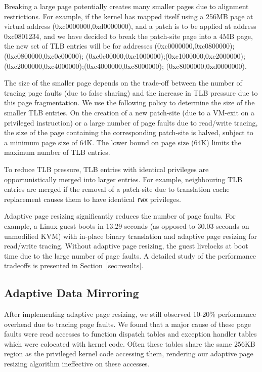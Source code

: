 \documentclass[10pt,twocolumn]{article}
\begin{document}
Breaking a large page potentially creates
many smaller pages due to alignment restrictions.
For example, if the kernel has mapped
itself using a 256MB page at virtual address (0xc0000000,0xd0000000), and a
patch is to be applied at address 0xc0801234, and we have decided to break
the patch-site page into a 4MB page, the new set of TLB entries will be for
addresses
(0xc0000000,0xc0800000);(0xc0800000,0xc0c00000);
(0xc0c00000,0xc1000000);(0xc1000000,0xc2000000);
(0xc2000000,0xc4000000);(0xc4000000,0xc8000000);
(0xc8000000,0xd0000000).

The size of the smaller page depends on the trade-off between the number
of tracing page faults (due to false sharing) and the increase in TLB pressure
due to this page fragmentation.
We use the following policy to determine the size of the smaller TLB entries. On the
creation of a new patch-site (due to a VM-exit on a privileged instruction) or a
large number of page faults due to read/write tracing,
the size of the page
containing the corresponding patch-site is halved, subject to
a minimum page size of 64K.
The lower bound on page size (64K) limits the maximum number of TLB entries.

To reduce TLB pressure, TLB entries with identical privileges are
opportunistically merged into
larger entries. For example, neighbouring TLB entries are merged if the
removal of a patch-site due to translation cache replacement causes
them to have identical {\tt rwx} privileges.

Adaptive page resizing significantly reduces the number of page faults. For
example, a Linux guest boots in 13.29 seconds (as opposed to 30.03 seconds on
unmodified KVM) with in-place binary translation
and adaptive page resizing for read/write tracing. Without adaptive page resizing,
the guest livelocks at boot time due to the large number of
page faults. A detailed study of the performance tradeoffs is presented in
Section~\ref{sec:results}.

\subsection{Adaptive Data Mirroring}
After implementing adaptive page resizing,
we still observed 10-20\% performance overhead due
to tracing page faults. We found that a major cause of these page faults were
read accesses to function dispatch tables and exception handler tables which were
colocated with kernel code. Often these tables share
the same 256KB region as the privileged kernel code accessing them, rendering our
adaptive page resizing algorithm ineffective on these accesses.
\end{document}
